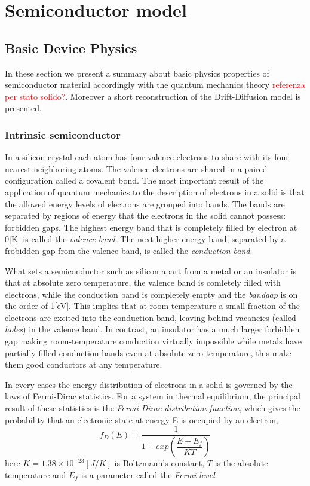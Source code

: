 \chapter{Semiconductor model}

\section{Basic Device Physics}
In these section we present a summary about basic physics properties of semiconductor material accordingly with the quantum mechanics theory \textcolor{red}{referenza per stato solido?}. Moreover a short reconstruction of the Drift-Diffusion model is presented.

\subsection{Intrinsic semiconductor}
In a silicon crystal each atom has four valence electrons to share with its four nearest neighboring atoms. The valence electrons are shared in a paired configuration called a covalent bond. The most important result of the application of quantum mechanics to the description of electrons in a solid is that the allowed energy levels of electrons are grouped into bands. The bands are separated by regions of energy that the electrons in the solid cannot possess: forbidden gaps. The highest energy band that is completely filled by electron at 0[K] is called the \textit{valence band}. The next higher energy band, separated by a frobidden gap from the valence band, is called the \textit{conduction band}.

What sets a semiconductor such as silicon apart from a metal or an insulator is that at absolute zero temperature, the valence band is comletely filled with electrons, while the conduction band is completely empty and the \textit{bandgap} is on the order of 1[eV].
This implies that at room temperature a small fraction of the electrons are excited into the conduction band, leaving behind vacancies (called \textit{holes}) in the valence band.
In contrast, an insulator has a much larger forbidden gap making room-temperature conduction virtually impossible while metals have partially filled conduction bands even at absolute zero temperature, this make them good conductors at any temperature.

In every cases the energy distribution of electrons in a solid is governed by the laws of Fermi-Dirac statistics. For a system in thermal equilibrium, the principal result of these statistics is the \textit{Fermi-Dirac distribution function}, which gives the probability that an electronic state at energy E is occupied by an electron,
\begin{equation}
\label{eq: fermi dirac distribution}
f_D(E) = \dfrac{1}{1+exp\left(\dfrac{E-E_f}{KT}\right)} 
\end{equation}
here $K=1.38\times10^{-23}[J/K]$ is Boltzmann's constant, $T$ is the absolute temperature and $E_f$ is a parameter called the \textit{Fermi level}.

